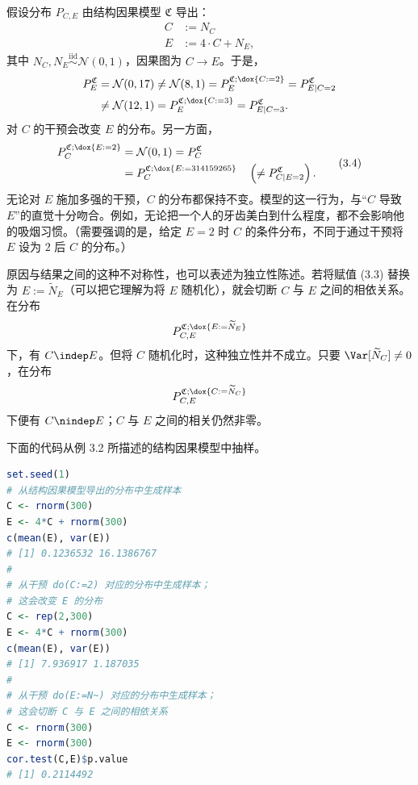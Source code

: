 \begin{example}[对原因和结果的干预]
假设分布 $P_{C,E}$ 由结构因果模型 $\mathfrak{C}$ 导出：
\begin{equation}
 \begin{aligned}
 C&:=N_C\\
 E&:=4\cdot C+N_E,
 \end{aligned}
 \tag{3.3}
\end{equation}
其中 $N_C,N_E\overset{\mathrm{iid}}{\sim}\mathcal{N}(0,1)$，因果图为 $C\to E$。于是，
\[
 \begin{aligned}
 P_E^{\mathfrak{C}}
 &=\mathcal{N}(0,17)\ne\mathcal{N}(8,1)
 =P_E^{\mathfrak{C};\dox{C:=2}}=P_{E\mid C=2}^{\mathfrak{C}}\\
 &\ne\mathcal{N}(12,1)
 =P_E^{\mathfrak{C};\dox{C:=3}}=P_{E\mid C=3}^{\mathfrak{C}}.
 \end{aligned}
\]
对 $C$ 的干预会改变 $E$ 的分布。另一方面，
\begin{equation}
 \begin{aligned}
 P_C^{\mathfrak{C};\dox{E:=2}}
 &=\mathcal{N}(0,1)=P_C^{\mathfrak{C}}\\
 &=P_C^{\mathfrak{C};\dox{E:=314159265}}
 \quad\left(\ne P_{C\mid E=2}^{\mathfrak{C}}\right).
 \end{aligned}
 \tag{3.4}
\end{equation}
无论对 $E$ 施加多强的干预，$C$ 的分布都保持不变。模型的这一行为，与“$C$ 导致 $E$”的直觉十分吻合。例如，无论把一个人的牙齿美白到什么程度，都不会影响他的吸烟习惯。（需要强调的是，给定 $E=2$ 时 $C$ 的条件分布，不同于通过干预将 $E$ 设为 $2$ 后 $C$ 的分布。）

原因与结果之间的这种不对称性，也可以表述为独立性陈述。若将赋值 (3.3) 替换为 $E:=\widetilde N_E$（可以把它理解为将 $E$ 随机化），就会切断 $C$ 与 $E$ 之间的相依关系。在分布
\[
 P_{C,E}^{\mathfrak{C};\dox{E:=\widetilde N_E}}
\]
下，有 $C\indep E$。但将 $C$ 随机化时，这种独立性并不成立。只要 $\Var[\widetilde N_C]\ne0$，在分布
\[
 P_{C,E}^{\mathfrak{C};\dox{C:=\widetilde N_C}}
\]
下便有 $C\nindep E$；$C$ 与 $E$ 之间的相关仍然非零。
\end{example}

\par\noindent\begin{minipage}{\linewidth}
\begin{codesnippet}
下面的代码从例 3.2 所描述的结构因果模型中抽样。
\begin{lstlisting}[language=R]
set.seed(1)
# 从结构因果模型导出的分布中生成样本
C <- rnorm(300)
E <- 4*C + rnorm(300)
c(mean(E), var(E))
# [1] 0.1236532 16.1386767
#
# 从干预 do(C:=2) 对应的分布中生成样本；
# 这会改变 E 的分布
C <- rep(2,300)
E <- 4*C + rnorm(300)
c(mean(E), var(E))
# [1] 7.936917 1.187035
#
# 从干预 do(E:=N~) 对应的分布中生成样本；
# 这会切断 C 与 E 之间的相依关系
C <- rnorm(300)
E <- rnorm(300)
cor.test(C,E)$p.value
# [1] 0.2114492
\end{lstlisting}
\end{codesnippet}
\end{minipage}\par
